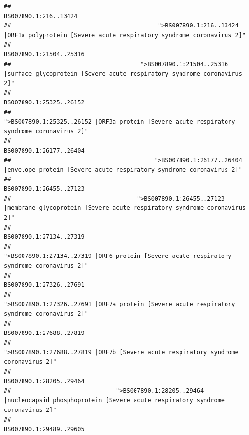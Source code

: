 \documentclass[
]{article}
\begin{document}
\begin{verbatim}
##                                                                                                                  BS007890.1:216..13424 
##                                          ">BS007890.1:216..13424 |ORF1a polyprotein [Severe acute respiratory syndrome coronavirus 2]" 
##                                                                                                                BS007890.1:21504..25316 
##                                     ">BS007890.1:21504..25316 |surface glycoprotein [Severe acute respiratory syndrome coronavirus 2]" 
##                                                                                                                BS007890.1:25325..26152 
##                                            ">BS007890.1:25325..26152 |ORF3a protein [Severe acute respiratory syndrome coronavirus 2]" 
##                                                                                                                BS007890.1:26177..26404 
##                                         ">BS007890.1:26177..26404 |envelope protein [Severe acute respiratory syndrome coronavirus 2]" 
##                                                                                                                BS007890.1:26455..27123 
##                                    ">BS007890.1:26455..27123 |membrane glycoprotein [Severe acute respiratory syndrome coronavirus 2]" 
##                                                                                                                BS007890.1:27134..27319 
##                                             ">BS007890.1:27134..27319 |ORF6 protein [Severe acute respiratory syndrome coronavirus 2]" 
##                                                                                                                BS007890.1:27326..27691 
##                                            ">BS007890.1:27326..27691 |ORF7a protein [Severe acute respiratory syndrome coronavirus 2]" 
##                                                                                                                BS007890.1:27688..27819 
##                                                    ">BS007890.1:27688..27819 |ORF7b [Severe acute respiratory syndrome coronavirus 2]" 
##                                                                                                                BS007890.1:28205..29464 
##                              ">BS007890.1:28205..29464 |nucleocapsid phosphoprotein [Severe acute respiratory syndrome coronavirus 2]" 
##                                                                                                                BS007890.1:29489..29605 

\end{verbatim}
\end{document}
